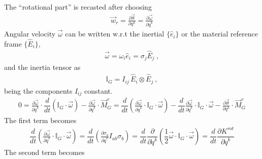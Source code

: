\documentclass[letterpaper,10pt,english]{jupyterBook}
\begin{document}
\sphinxAtStartPar
The “rotational part” is recasted after choosing
\begin{equation*}
\begin{split}\vec{w}_r = \frac{\partial \vec{\theta}}{\partial q^k} = \frac{\partial \vec{\omega}}{\partial \dot{q}^k} \end{split}
\end{equation*}
\sphinxAtStartPar
Angular velocity \(\vec{\omega}\) can be written w.r.t the inertial \(\{ \hat{e}_i \}\) or the material reference frame \(\{ \hat{E}_i \}\),
\begin{equation*}
\begin{split}\vec{\omega} = \omega_i \hat{e}_i = \sigma_j \hat{E}_j \ ,\end{split}
\end{equation*}
\sphinxAtStartPar
and the inertia tensor as
\begin{equation*}
\begin{split}\mathbb{I}_G = I_{ij} \, \hat{E}_i \otimes \hat{E}_j \ ,\end{split}
\end{equation*}
\sphinxAtStartPar
being the components \(I_{ij}\) constant.
\begin{equation*}
\begin{split}0 = \frac{\partial \vec{\omega}}{\partial \dot{q}^k} \cdot \dfrac{d}{d t} \left( \mathbb{I}_G \cdot \vec{\omega} \right) - \frac{\partial \vec{\omega}}{\partial \dot{q}^k } \cdot \vec{M}^e_G = \dfrac{d}{dt}\left( \frac{\partial \vec{\omega}}{\partial \dot{q}^k} \cdot \mathbb{I}_G \cdot \vec{\omega} \right) - \dfrac{d}{dt} \frac{\partial \vec{\omega}}{\partial \dot{q}^k} \cdot \mathbb{I}_G \cdot \vec{\omega} - \frac{\partial \vec{\theta}}{\partial q^k} \cdot \vec{M}^e_G\end{split}
\end{equation*}
\sphinxAtStartPar
The first term becomes
\begin{equation*}
\begin{split}\dfrac{d}{dt}\left( \frac{\partial \vec{\omega}}{\partial \dot{q}^k} \cdot \mathbb{I}_G \cdot \vec{\omega} \right) = \dfrac{d}{dt} \left( \frac{\partial \sigma_a}{\partial \dot{q}^k} I_{ab} \sigma_b \right) = \dfrac{d}{dt} \dfrac{\partial}{\partial \dot{q}^k}\left( \dfrac{1}{2} \vec{\omega} \cdot \mathbb{I}_G \cdot \vec{\omega} \right) = \dfrac{d}{dt}\dfrac{\partial K^{rot}}{\partial \dot{q}^k}\end{split}
\end{equation*}
\sphinxAtStartPar
The second term becomes
\end{document}
